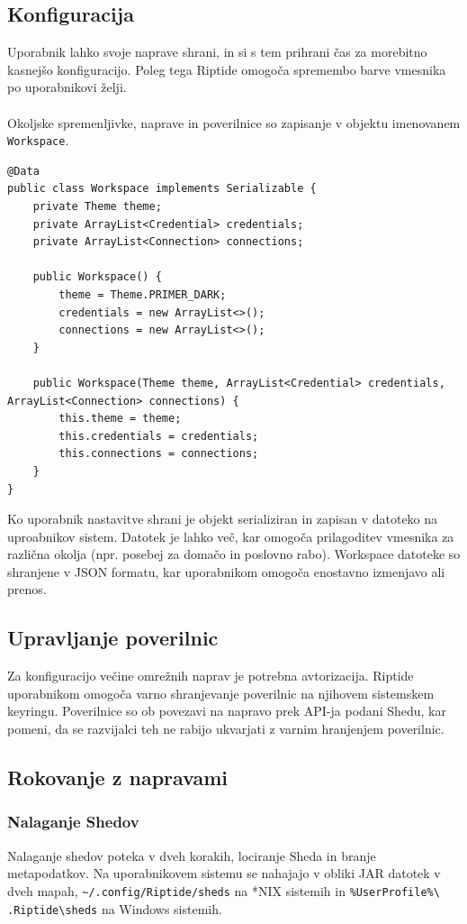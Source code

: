 \documentclass[12pt]{article}
\begin{document}
\subsection{Konfiguracija}
Uporabnik lahko svoje naprave shrani, in si s tem prihrani čas za
morebitno kasnejšo konfiguracijo. Poleg tega Riptide omogoča spremembo
barve vmesnika po uporabnikovi želji.
\\\\
Okoljske spremenljivke, naprave in poverilnice so zapisanje v objektu
imenovanem \texttt{Workspace}.

\begin{lstlisting}[style=JavaStyle]
@Data
public class Workspace implements Serializable {
	private Theme theme;
	private ArrayList<Credential> credentials;
	private ArrayList<Connection> connections;

	public Workspace() {
		theme = Theme.PRIMER_DARK;
		credentials = new ArrayList<>();
		connections = new ArrayList<>();
	}

	public Workspace(Theme theme, ArrayList<Credential> credentials, ArrayList<Connection> connections) {
		this.theme = theme;
		this.credentials = credentials;
		this.connections = connections;
	}
}
\end{lstlisting}
Ko uporabnik nastavitve shrani je objekt serializiran in zapisan v datoteko
na uproabnikov sistem. Datotek je lahko več, kar omogoča prilagoditev
vmesnika za različna okolja (npr. posebej za domačo in poslovno rabo).
Workspace datoteke so shranjene v JSON formatu, kar uporabnikom omogoča
enostavno izmenjavo ali prenos.

\subsection{Upravljanje poverilnic}
Za konfiguracijo večine omrežnih naprav je potrebna avtorizacija.
Riptide uporabnikom omogoča varno shranjevanje poverilnic na njihovem
sistemskem keyringu. Poverilnice so ob povezavi na napravo prek API-ja
podani Shedu, kar pomeni, da se razvijalci teh ne rabijo ukvarjati z
varnim hranjenjem poverilnic.

\subsection{Rokovanje z napravami}
\subsubsection{Nalaganje Shedov} \label{nalaganje-shedov}
Nalaganje shedov poteka v dveh korakih, lociranje Sheda in branje
metapodatkov. Na uporabnikovem sistemu se nahajajo v obliki JAR datotek v
dveh mapah, \texttt{\textasciitilde/.config/Riptide/sheds} na *NIX sistemih
in \texttt{\%UserProfile\%\textbackslash\\.Riptide\textbackslash sheds} na
Windows sistemih.
\end{document}
